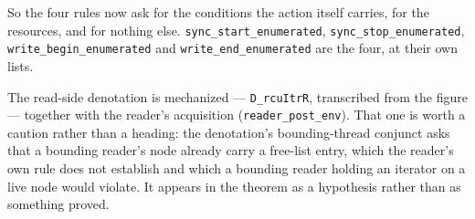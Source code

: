 So the four rules now ask for the conditions the action itself carries, for the
resources, and for nothing else.  \texttt{sync\_start\_enumerated},
\texttt{sync\_stop\_enumerated}, \texttt{write\_begin\_enumerated} and
\texttt{write\_end\_enumerated} are the four, at their own lists.

The read-side denotation is mechanized --- \texttt{D\_rcuItrR}, transcribed from
the figure --- together with the reader's acquisition
(\texttt{reader\_post\_env}).  That one is worth a caution rather than a
heading: the denotation's bounding-thread conjunct asks that a bounding reader's
node already carry a free-list entry, which the reader's own rule does not
establish and which a bounding reader holding an iterator on a live node would
violate.  It appears in the theorem as a hypothesis rather than as something
proved.
